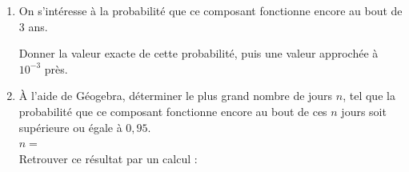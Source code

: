 \begin{exercice_cours}[\quad]{}
\begin{enumerate}
\begin{enumerate}
		\smallskip
	\end{enumerate}
	\item On s'intéresse à la probabilité que ce composant fonctionne encore au bout de $3$ ans.
	
	Donner la valeur exacte de cette probabilité, puis une valeur approchée à $10^{-3}$ près. \\
	
	\dotfill
	
	\smallskip
	\item À l'aide de Géogebra, déterminer le plus grand nombre de jours $n$, tel que la probabilité que ce composant fonctionne encore au bout de ces $n$ jours soit supérieure ou égale à $0,95$.\\
	
	$n =$\makebox[0.1\linewidth]{\dotfill} \hfill {}\\
	
	Retrouver ce résultat par un calcul :\\
	
	\dotfill\\
	
	\dotfill\\
	
	\dotfill\\
	
	\dotfill\\
	
	\dotfill\\
	
	\dotfill
\end{enumerate}

\end{exercice_cours}

